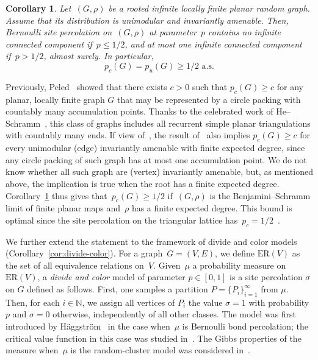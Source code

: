 \documentclass[11pt,letterpaper]{amsart}
\newcounter{n}
\numberwithin{n}{section}
\theoremstyle{plain}
\newtheorem{corollary}[n]{Corollary}
\theoremstyle{definition}
\theoremstyle{remark}
\newcommand{\1}{\mathbbm{1}}
\begin{document}
\begin{corollary}\label{cor:p-c}
	Let~$(G,\rho)$ be a rooted infinite locally finite planar random graph.
	Assume that its distribution is unimodular and invariantly amenable.
	Then,  Bernoulli site percolation on~$(G,\rho)$ at parameter~$p$ contains no infinite connected component if~$p\leq 1/2$, and at most one infinite connected component if~$p> 1/2$, almost surely.
	In particular,
	\[
		p_c(G)=p_u(G)\geq 1/2 \text{ a.s.}
	\]
\end{corollary}

Previously, Peled~\cite{Pel20} showed that there exists $c >0$ such that $p_c(G) \geq c$ for any planar, locally finite graph $G$ that may be represented by a circle packing with countably many accumulation points. Thanks to the celebrated work of He--Schramm~\cite{he1995hyperbolic}, this class of graphs includes all recurrent simple planar triangulations with countably many ends.
If view of~\cite{AngHutNacRay18}, the result of~\cite{Pel20} also implies $p_c(G) \geq c$ for every unimodular (edge) invariantly amenable with finite expected degree, since any circle packing of such graph has at most one accumulation point. We do not know whether all such graph are (vertex) invariantly amenable, but, as mentioned above, the implication is true when the root has a finite expected degree.
Corollary~\ref{cor:p-c} thus gives that~$p_c(G)\geq 1/2$ if~$(G,\rho)$ is the Benjamini--Schramm limit of finite planar maps and~$\rho$ has a finite expected degree.
This bound is optimal since the site percolation on the triangular lattice has~$p_c=1/2$~\cite{Kes80}.

We further extend the statement to the framework of divide and color models (Corollary~\ref{cor:divide-color}).
For a graph~$G=(V,E)$, we define $\mathrm{ER}(V)$ as the set of all equivalence relations on~$V$. 
Given~$\mu$ a probability measure on~$\mathrm{ER}(V)$, a {\em divide and color} model of parameter $p\in [0,1]$ is a site percolation $\sigma$ on $G$ defined as follows. First, one samples a partition $P = \{P_i\}_{i=1}^\infty$ from $\mu$. 
Then, for each $i \in \mathbb{N}$, we assign all vertices of $P_i$ the value $\sigma = 1$ with probability $p$ and $\sigma = 0$ otherwise, independently of all other classes. 
The model was first introduced by Häggström~\cite{Hag01} in the case when~$\mu$ is Bernoulli bond percolation; the critical value function in this case was studied in~\cite{BalBefTas13,BalBefTas13a}.
The Gibbs properties of the measure when~$\mu$ is the random-cluster model was considered in~\cite{Bal10}.
\end{document}
